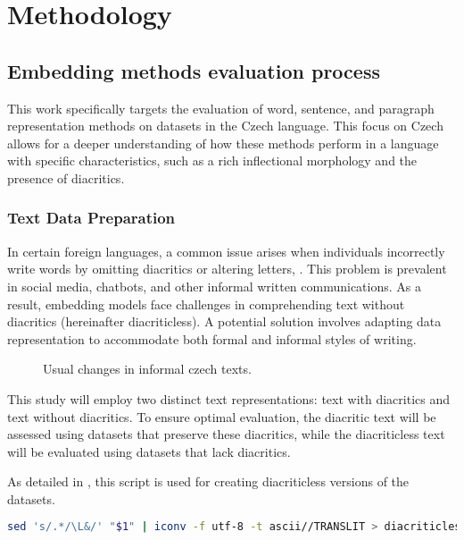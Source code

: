 
\chapter{Methodology\label{chap:methodology}}

\section{Embedding methods evaluation process}

This work specifically targets the evaluation of word, sentence, and paragraph representation methods on datasets in the Czech language.
This focus on Czech allows for a deeper understanding of how these methods perform in a language with specific characteristics, such as a rich inflectional morphology and the presence of diacritics.

\subsection{Text Data Preparation}
In certain foreign languages, a common issue arises when individuals incorrectly write words by omitting diacritics or altering letters, .
This problem is prevalent in social media, chatbots, and other informal written communications.
As a result, embedding models face challenges in comprehending text without diacritics (hereinafter diacriticless).
A potential solution involves adapting data representation to accommodate both formal and informal styles of writing.

\begin{figure}[h]
  \centering
  
  \caption{Usual changes in informal czech texts.}
  \label{fig:diacritics_diacriticless}
\end{figure} 

This study will employ two distinct text representations: text with diacritics and text without diacritics.
To ensure optimal evaluation, the diacritic text will be assessed using datasets that preserve these diacritics, while the diacriticless text will be evaluated using datasets that lack diacritics.

As detailed in , this script is used for creating diacriticless versions of the datasets.

\begin{lstlisting}[language=bash,basicstyle=\small\ttfamily, frame=single, caption={Script for removing diacritics using Unix utilities}, captionpos=b, label={lst:diacriticless.sh},backgroundcolor=\color{light-gray}] 
  sed 's/.*/\L&/' "$1" | iconv -f utf-8 -t ascii//TRANSLIT > diacriticless/"$1"
\end{lstlisting}

